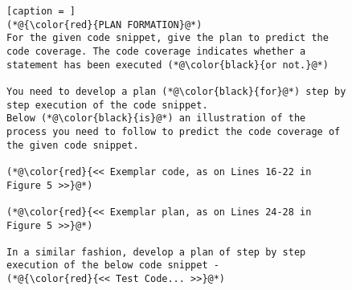 \begin{figure}[t]

\begin{minipage}{.45\textwidth}        
\begin{lstlisting}[caption = ]
(*@{\color{red}{PLAN FORMATION}@*)
For the given code snippet, give the plan to predict the code coverage. The code coverage indicates whether a statement has been executed (*@\color{black}{or not.}@*) 

You need to develop a plan (*@\color{black}{for}@*) step by step execution of the code snippet. 
Below (*@\color{black}{is}@*) an illustration of the process you need to follow to predict the code coverage of the given code snippet. 

(*@\color{red}{<< Exemplar code, as on Lines 16-22 in Figure 5 >>}@*) 

(*@\color{red}{<< Exemplar plan, as on Lines 24-28 in Figure 5 >>}@*) 

In a similar fashion, develop a plan of step by step execution of the below code snippet - 
(*@{\color{red}{<< Test Code... >>}@*)

\end{lstlisting}
\vspace{-9pt}
\label{fig:example-plan-formation}
\end{minipage}


\end{figure}
